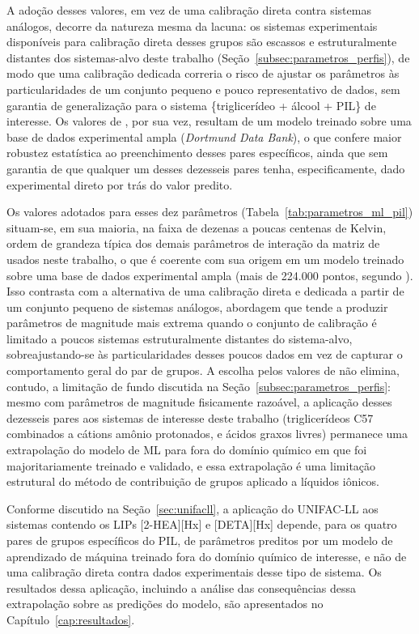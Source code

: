 A adoção desses valores, em vez de uma calibração direta contra sistemas análogos, decorre da natureza mesma da lacuna: os sistemas experimentais disponíveis para calibração direta desses grupos são escassos e estruturalmente distantes dos sistemas-alvo deste trabalho (Seção~\ref{subsec:parametros_perfis}), de modo que uma calibração dedicada correria o risco de ajustar os parâmetros às particularidades de um conjunto pequeno e pouco representativo de dados, sem garantia de generalização para o sistema \{triglicerídeo + álcool + PIL\} de interesse. Os valores de , por sua vez, resultam de um modelo treinado sobre uma base de dados experimental ampla (\textit{Dortmund Data Bank}), o que confere maior robustez estatística ao preenchimento desses pares específicos, ainda que sem garantia de que qualquer um desses dezesseis pares tenha, especificamente, dado experimental direto por trás do valor predito.

Os valores adotados para esses dez parâmetros (Tabela~\ref{tab:parametros_ml_pil}) situam-se, em sua maioria, na faixa de dezenas a poucas centenas de Kelvin, ordem de grandeza típica dos demais parâmetros de interação da matriz de  usados neste trabalho, o que é coerente com sua origem em um modelo treinado sobre uma base de dados experimental ampla (mais de 224.000 pontos, segundo ). Isso contrasta com a alternativa de uma calibração direta e dedicada a partir de um conjunto pequeno de sistemas análogos, abordagem que tende a produzir parâmetros de magnitude mais extrema quando o conjunto de calibração é limitado a poucos sistemas estruturalmente distantes do sistema-alvo, sobreajustando-se às particularidades desses poucos dados em vez de capturar o comportamento geral do par de grupos. A escolha pelos valores de  não elimina, contudo, a limitação de fundo discutida na Seção~\ref{subsec:parametros_perfis}: mesmo com parâmetros de magnitude fisicamente razoável, a aplicação desses dezesseis pares aos sistemas de interesse deste trabalho (triglicerídeos C57 combinados a cátions amônio protonados, e ácidos graxos livres) permanece uma extrapolação do modelo de ML para fora do domínio químico em que foi majoritariamente treinado e validado, e essa extrapolação é uma limitação estrutural do método de contribuição de grupos aplicado a líquidos iônicos.

Conforme discutido na Seção~\ref{sec:unifacll}, a aplicação do UNIFAC-LL aos sistemas contendo os LIPs [2-HEA][Hx] e [DETA][Hx] depende, para os quatro pares de grupos específicos do PIL, de parâmetros preditos por um modelo de aprendizado de máquina treinado fora do domínio químico de interesse, e não de uma calibração direta contra dados experimentais desse tipo de sistema. Os resultados dessa aplicação, incluindo a análise das consequências dessa extrapolação sobre as predições do modelo, são apresentados no Capítulo~\ref{cap:resultados}.

